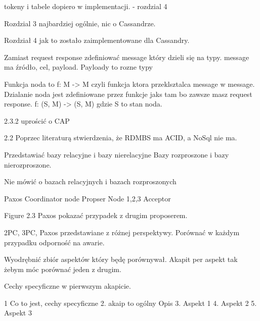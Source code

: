 tokeny i tabele dopiero w implementacji.  - rozdzial 4

Rozdzial 3 najbardziej ogólnie, nic o Cassandrze.

Rozdział 4 jak to zostało zaimplementowane dla Cassandry.

Zamiast request response zdefiniować message który dzieli się na typy.
message ma źródło, cel, payload. Payloady to rozne typy

Funkcja noda to f: M -> M 
czyli funkcja ktora przeklsztalca message w message. 
Dzialanie noda jest zdefiniowane przez funkcje jaks tam bo zawsze masz request response.
f: (S, M) -> (S, M)
gdzie S to stan noda.

2.3.2 uprościć o CAP

2.2
Poprzec literaturą stwierdzenia, że RDMBS ma ACID, a NoSql nie ma.

Przedstawiać bazy relacyjne i bazy nierelacyjne
Bazy rozproszone i bazy nierozproszone.

Nie mówić o bazach relacyjnych i bazach rozproszonych

Paxos
Coordinator node Propser
Node 1,2,3 Acceptor

Figure 2.3 Paxos pokazać przypadek z drugim proposerem.

2PC, 3PC, Paxos przedstawiane z różnej perspektywy.
Porównać w każdym przypadku odporność na awarie.

Wyodrębnić zbiór aspektów który będę porównywał. 
Akapit per aspekt tak żebym móc porównać jeden z drugim.

Cechy specyficzne w pierwszym akapicie.

1 Co to jest, cechy specyficzne
2. akaip to ogólny Opis
3. Aspekt 1
4. Aspekt 2
5. Aspekt 3



